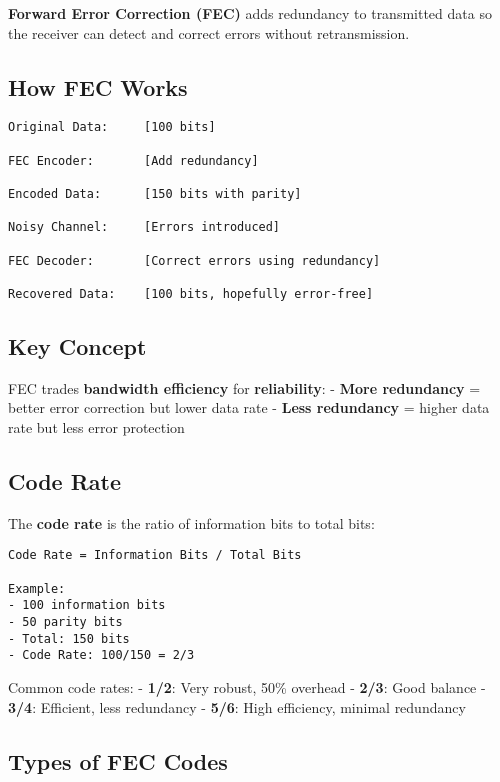 \textbf{Forward Error Correction (FEC)} adds redundancy to transmitted
data so the receiver can detect and correct errors without
retransmission.

\subsection{How FEC Works}\label{how-fec-works}

\begin{verbatim}
Original Data:     [100 bits]
      
FEC Encoder:       [Add redundancy]
      
Encoded Data:      [150 bits with parity]
      
Noisy Channel:     [Errors introduced]
      
FEC Decoder:       [Correct errors using redundancy]
      
Recovered Data:    [100 bits, hopefully error-free]
\end{verbatim}

\subsection{Key Concept}\label{key-concept}

FEC trades \textbf{bandwidth efficiency} for \textbf{reliability}: -
\textbf{More redundancy} = better error correction but lower data rate -
\textbf{Less redundancy} = higher data rate but less error protection

\subsection{Code Rate}\label{code-rate}

The \textbf{code rate} is the ratio of information bits to total bits:

\begin{verbatim}
Code Rate = Information Bits / Total Bits

Example: 
- 100 information bits
- 50 parity bits
- Total: 150 bits
- Code Rate: 100/150 = 2/3
\end{verbatim}

Common code rates: - \textbf{1/2}: Very robust, 50\% overhead -
\textbf{2/3}: Good balance - \textbf{3/4}: Efficient, less redundancy -
\textbf{5/6}: High efficiency, minimal redundancy

\subsection{Types of FEC Codes}\label{types-of-fec-codes}

